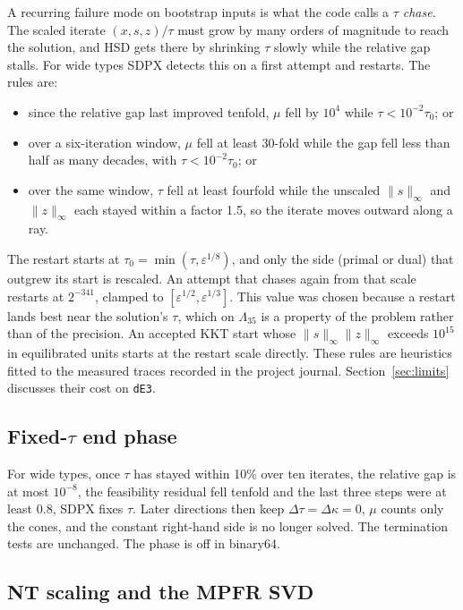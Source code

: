 \documentclass[11pt]{article}
\newcommand{\code}[1]{\texttt{#1}}
\newcommand{\eps}{\varepsilon}
\begin{document}
A recurring failure mode on bootstrap inputs is what the code calls a
\emph{$\tau$ chase}. The scaled iterate $(x,s,z)/\tau$ must grow by many
orders of magnitude to reach the solution, and HSD gets there by shrinking
$\tau$ slowly while the relative gap stalls. For wide types SDPX detects this
on a first attempt and restarts. The rules are:
\begin{itemize}
  \item since the relative gap last improved tenfold, $\mu$ fell by $10^4$
    while $\tau < 10^{-2}\tau_0$; or
  \item over a six-iteration window, $\mu$ fell at least 30-fold while the gap
    fell less than half as many decades, with $\tau<10^{-2}\tau_0$; or
  \item over the same window, $\tau$ fell at least fourfold while the unscaled
    $\|s\|_\infty$ and $\|z\|_\infty$ each stayed within a factor 1.5, so the
    iterate moves outward along a ray.
\end{itemize}
The restart starts at $\tau_0 = \min(\tau, \eps^{1/8})$, and only the side
(primal or dual) that outgrew its start is rescaled. An attempt that chases
again from that scale restarts at $2^{-341}$, clamped to
$[\eps^{1/2},\eps^{1/3}]$. This value was chosen because a restart lands best
near the solution's $\tau$, which on $\Lambda_{35}$ is a property of the
problem rather than of the precision. An accepted KKT start whose
$\|s\|_\infty\|z\|_\infty$ exceeds $10^{15}$ in equilibrated units starts at
the restart scale directly. These rules are heuristics fitted to the measured
traces recorded in the project journal. Section~\ref{sec:limits} discusses
their cost on \code{dE3}.

\subsection{\texorpdfstring{Fixed-$\tau$ end phase}{Fixed-tau end phase}}

For wide types, once $\tau$ has stayed within 10\% over ten iterates, the
relative gap is at most $10^{-8}$, the feasibility residual fell tenfold and the
last three steps were at least $0.8$, SDPX fixes $\tau$. Later directions then
keep $\Delta\tau=\Delta\kappa=0$, $\mu$ counts only the cones, and the constant
right-hand side is no longer solved. The termination tests are unchanged. The
phase is off in binary64.

\subsection{NT scaling and the MPFR SVD}
\label{sec:nt}
\end{document}
